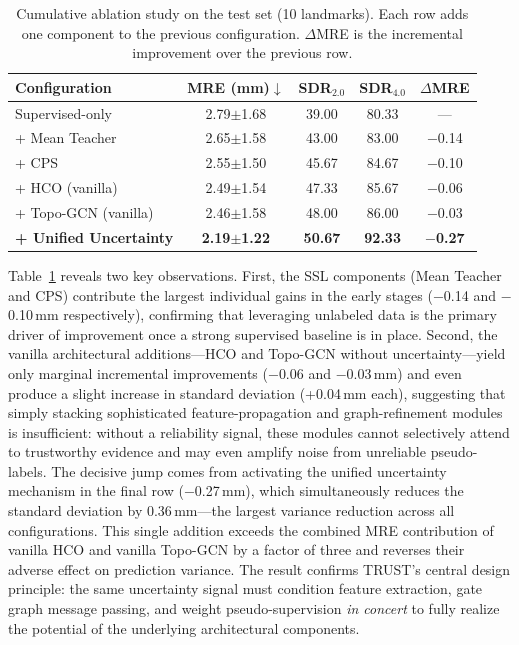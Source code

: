 \documentclass[conference]{IEEEtran}
\begin{document}
\begin{table}[t]
\centering
\caption{Cumulative ablation study on the test set (10 landmarks). Each row adds one component to the previous configuration. $\Delta$MRE is the incremental improvement over the previous row.}
\label{tab:ablation}
\setlength{\tabcolsep}{4pt}
\begin{tabular}{l c c c c}
\toprule
Configuration & MRE (mm)$\downarrow$ & \scriptsize SDR$_{2.0}$ & \scriptsize SDR$_{4.0}$ & $\Delta$MRE \\
\midrule
Supervised-only           & 2.79$\pm$1.68 & 39.00 & 80.33 & ---     \\
+ Mean Teacher            & 2.65$\pm$1.58 & 43.00 & 83.00 & $-$0.14 \\
+ CPS                     & 2.55$\pm$1.50 & 45.67 & 84.67 & $-$0.10 \\
+ HCO (vanilla)           & 2.49$\pm$1.54 & 47.33 & 85.67 & $-$0.06 \\
+ Topo-GCN (vanilla)      & 2.46$\pm$1.58 & 48.00 & 86.00 & $-$0.03 \\
\midrule
\textbf{+ Unified Uncertainty} & \textbf{2.19$\pm$1.22} & \textbf{50.67} & \textbf{92.33} & \textbf{$-$0.27} \\
\bottomrule
\end{tabular}
\end{table}

Table~\ref{tab:ablation} reveals two key observations. First, the SSL components (Mean Teacher and CPS) contribute the largest individual gains in the early stages ($-$0.14 and $-$0.10\,mm respectively), confirming that leveraging unlabeled data is the primary driver of improvement once a strong supervised baseline is in place. Second, the vanilla architectural additions---HCO and Topo-GCN without uncertainty---yield only marginal incremental improvements ($-$0.06 and $-$0.03\,mm) and even produce a slight increase in standard deviation (+0.04\,mm each), suggesting that simply stacking sophisticated feature-propagation and graph-refinement modules is insufficient: without a reliability signal, these modules cannot selectively attend to trustworthy evidence and may even amplify noise from unreliable pseudo-labels. The decisive jump comes from activating the unified uncertainty mechanism in the final row ($-$0.27\,mm), which simultaneously reduces the standard deviation by 0.36\,mm---the largest variance reduction across all configurations. This single addition exceeds the combined MRE contribution of vanilla HCO and vanilla Topo-GCN by a factor of three and reverses their adverse effect on prediction variance. The result confirms TRUST's central design principle: the same uncertainty signal must condition feature extraction, gate graph message passing, and weight pseudo-supervision \emph{in concert} to fully realize the potential of the underlying architectural components.
\end{document}
